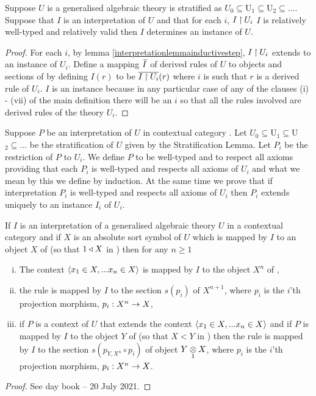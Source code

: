 \begin{lemma}
Suppose $U$ is a  generalised algebraic theory is stratified as  $U_0 \subseteq $U$_1 \subseteq $U$_2 \subseteq ...$. 
 Suppose that $I$ is an interpretation of $U$  and that  for each $i$, $I \restrict U_i$  
$I$ is relatively well-typed and relatively valid then $I$ determines an instance of $U$.
\end{lemma}
\begin{proof}
For each $i$, by lemma \ref{interpretationlemmainductivestep}, $I \restrict U_i$ extends to an instance of $U_i$. Define a mapping
$\Ibar$ of derived rules of $U$ to objects and sections of \catcw by defining $I(r)$ to be $\overline{I \restrict U_i}(r)$ where
$i$ is such that $r$ is a derived rule of $U_i$. $I$ is an instance because in any particular case of any of the clauses (i) - (vii) of the main definition 
there will be an $i$ so that all the rules involved are derived rules of the theory $U_i$. 
\end{proof}

\begin{oldtt}
\note Suppose $P$ be an interpretation of $U$ in contextual category \catc.
Let $U_0 \subseteq $U$_1 \subseteq $U$_2 \subseteq ...$ be the stratification of $U$ given by the Stratification Lemma. 
Let $P_i$ be the restriction of $P$ to $U_i$. 
We define $P$ to be well-typed and to respect all axioms 
providing that  each  $P_i$ is well-typed and respects all axioms of $U_i$ and 
what we mean by this we define by induction. 
At the same time we prove that if interpretation $P_i$ is well-typed and respects all axioms of $U_i$ then $P_i$
extends uniquely to an instance $I_i$ of $U_i$.  
\end{oldtt}

\begin{lemma}
If $I$ is an interpretation of a generalised algebraic theory $U$ in a contextual category \catcw and if $X$ is an absolute sort symbol of $U$ which is mapped 
by $I$ to an object $X$ of \catcw (so that $1 \base X$ in \catc) then for any $n \geq 1$ 
\begin{enumerate}[(i)]
\item
The context $\tuple{\ofT{x_1}{X},...\ofT{x_n}{X}}$ is mapped by $I$ to the object $X^n$ of \catc,
\item the rule 
 is mapped by $I$ to the section $s(p_i)$ of $X^{n+1}$, where $p_i$ is the $i$'th projection morphism, $p_i: X^n \morph X$,
\item if $P$ is a context of $U$ that extends the context $\tuple{\ofT{x_1}{X},...\ofT{x_n}{X}}$ and if $P$ is mapped by $I$ to
the object $Y$ of \catcw (so that $X < Y$ in \catc) then the rule 
 is mapped by $I$ to the section $s(p_{Y,X^n}\circ p_i)$ of object $\crossx{Y}{X}{1}$, where $p_i$ is the $i$'th projection morphism, $p_i: X^n \morph X$.
\end{enumerate}
\end{lemma}
\begin{proof}
See day book -- 20 July 2021.
\end{proof}
